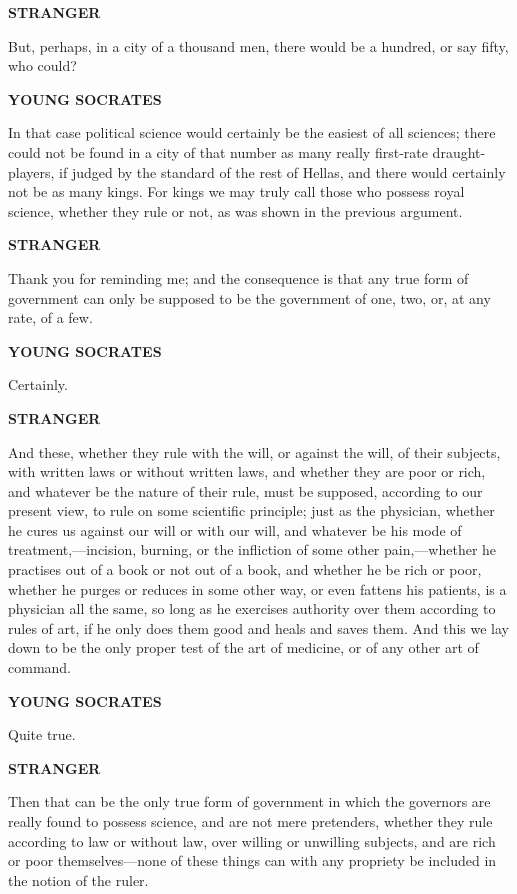 \documentclass[11pt,letter]{article}
\begin{document}
\par \textbf{STRANGER}
\par   But, perhaps, in a city of a thousand men, there would be a hundred, or say fifty, who could?

\par \textbf{YOUNG SOCRATES}
\par   In that case political science would certainly be the easiest of all sciences; there could not be found in a city of that number as many really first-rate draught-players, if judged by the standard of the rest of Hellas, and there would certainly not be as many kings. For kings we may truly call those who possess royal science, whether they rule or not, as was shown in the previous argument.

\par \textbf{STRANGER}
\par   Thank you for reminding me; and the consequence is that any true form of government can only be supposed to be the government of one, two, or, at any rate, of a few.

\par \textbf{YOUNG SOCRATES}
\par   Certainly.

\par \textbf{STRANGER}
\par   And these, whether they rule with the will, or against the will, of their subjects, with written laws or without written laws, and whether they are poor or rich, and whatever be the nature of their rule, must be supposed, according to our present view, to rule on some scientific principle; just as the physician, whether he cures us against our will or with our will, and whatever be his mode of treatment,—incision, burning, or the infliction of some other pain,—whether he practises out of a book or not out of a book, and whether he be rich or poor, whether he purges or reduces in some other way, or even fattens his patients, is a physician all the same, so long as he exercises authority over them according to rules of art, if he only does them good and heals and saves them. And this we lay down to be the only proper test of the art of medicine, or of any other art of command.

\par \textbf{YOUNG SOCRATES}
\par   Quite true.

\par \textbf{STRANGER}
\par   Then that can be the only true form of government in which the governors are really found to possess science, and are not mere pretenders, whether they rule according to law or without law, over willing or unwilling subjects, and are rich or poor themselves—none of these things can with any propriety be included in the notion of the ruler.
\end{document}
